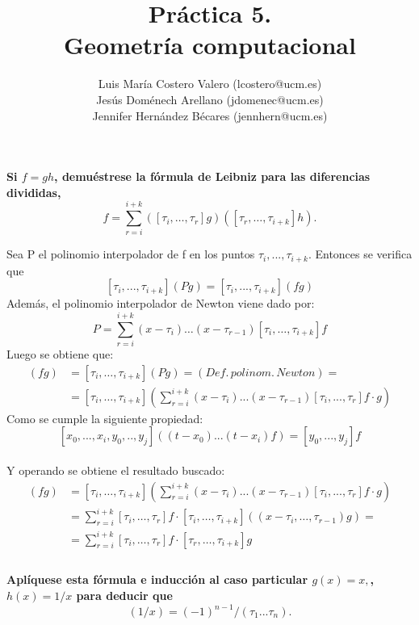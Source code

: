 \documentclass[12pt,a4paper]{article}
\title{Práctica 5. \\ Geometría computacional}
\author{Luis María Costero Valero (lcostero@ucm.es)\\ Jesús Doménech
  Arellano (jdomenec@ucm.es) \\ Jennifer Hernández Bécares (jennhern@ucm.es)}
\date{}
\begin{document}
\maketitle
\doublespace

\textbf{Si $f=gh$, demuéstrese la fórmula de Leibniz para las diferencias divididas,}
\begin{equation*}
  [\tau_i,\dots,\tau_{i+k}]f=\sum\limits_{r=i}^{i+k}([\tau_i,\dots,\tau_r]g)([\tau_r,\dots,\tau_{i+k}]h).
\end{equation*}

Sea P el polinomio interpolador de f en los puntos $\tau_i, ... ,
\tau_{i+k}$. Entonces se verifica que $$[\tau_{i}, ..., \tau_{i+k}](Pg) =
[\tau_i, ..., \tau_{i+k}](fg)$$
Además, el polinomio interpolador de Newton viene dado por:
$$ P = \sum\limits^{i+k}_{r=i}(x-\tau_i)\dots(x-\tau_{r-1})[\tau_i,\dots,\tau_{i+k}]f$$
Luego se obtiene que:
\begin{align*}
  [\tau_i,\dots,\tau_{i+k}](fg) &= [\tau_i,\dots,\tau_{i+k}](Pg) = (Def.\,polinom.\,Newton)=\\
                      &= [\tau_i,\dots,\tau_{i+k}]\left(\sum\limits_{r=i}^{i+k}(x-\tau_i)...(x-\tau_{r-1})[\tau_i,...,\tau_r]f
                        \cdot g\right)
\end{align*}
Como se cumple la siguiente propiedad:
$$[x_0, ..., x_i, y_0, .., y_j]((t-x_0)...(t-x_i)f) = [y_0,...,y_j]f$$\\
Y operando se obtiene el resultado buscado:
\begin{align*}
  [\tau_i,\dots,\tau_{i+k}](fg) &= [\tau_i,\dots,\tau_{i+k}]\left(\sum\limits_{r=i}^{i+k}(x-\tau_i)...(x-\tau_{r-1})[\tau_i,...,\tau_r]f
                        \cdot g\right)\\
                      &=\sum\limits^{i+k}_{r=i}[\tau_i,\dots,\tau_{r}]f \cdot
                        [\tau_i,\dots,\tau_{i+k}]\left((x-\tau_i,\dots,\tau_{r-1})g\right)=\\
                      &=\sum\limits^{i+k}_{r=i}[\tau_i,\dots,\tau_r]f \cdot [\tau_r,
                        \dots, \tau_{i+k}]g\\
\end{align*}\\

\textbf{Aplíquese esta fórmula e inducción al caso particular $g(x)=x,$, $h(x)=1/x$ para deducir que}
\begin{equation*}
  [\tau_1,...,\tau_n](1/x)=(-1)^{n-1}/(\tau_1...\tau_n).
\end{equation*}
\end{document}
